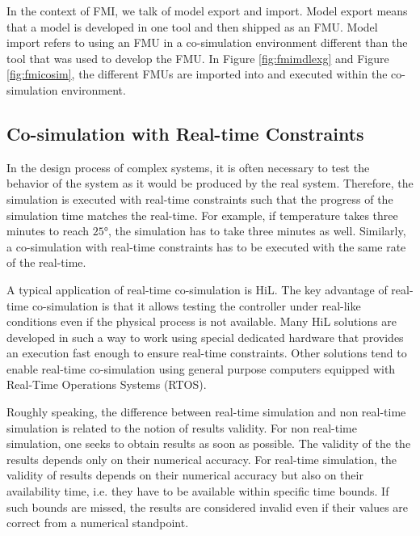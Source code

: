 In the context of FMI, we talk of model export and import. Model export means that a model is developed in one tool and then shipped as an FMU. Model import refers to using an FMU in a co-simulation environment different than the tool that was used to develop the FMU. In Figure \ref{fig:fmimdlexg} and Figure \ref{fig:fmicosim}, the different FMUs are imported into and executed within the co-simulation environment.



 

\subsection{Co-simulation with Real-time Constraints}

In the design process of complex systems, it is often necessary to test the behavior of the system as it would be produced by the real system. Therefore, the simulation is executed with real-time constraints such that the progress of the simulation time matches the real-time. For example, if temperature takes three minutes to reach $25$°, the simulation has to take three minutes as well. Similarly, a co-simulation with real-time constraints has to be executed with the same rate of the real-time.

A typical application of real-time co-simulation is HiL. The key advantage of real-time co-simulation is that it allows testing the controller under real-like conditions even if the physical process is not available. Many HiL solutions are developed in such a way to work using special dedicated hardware that provides an execution fast enough to ensure real-time constraints. Other solutions tend to enable real-time co-simulation using general purpose computers equipped with Real-Time Operations Systems (RTOS).

Roughly speaking, the difference between real-time simulation and non real-time simulation is related to the notion of results validity. For non real-time simulation, one seeks to obtain results as soon as possible. The validity of the the results depends only on their numerical accuracy. For real-time simulation, the validity of results depends on their numerical accuracy but also on their availability time, i.e. they have to be available within specific time bounds. If such bounds are missed, the results are considered invalid even if their values are correct from a numerical standpoint.

